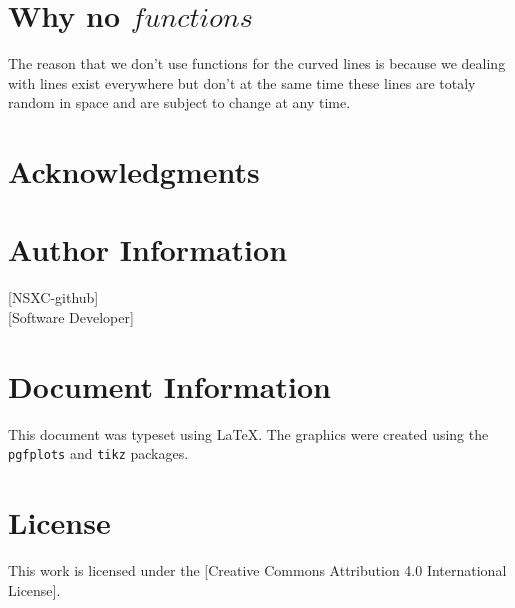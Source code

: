 \documentclass{article}
\begin{document}
\section{Why no \(functions\)}

The reason that we don't use functions for the curved lines is because we dealing with lines exist everywhere but don't at the same time these lines are totaly random in space and are subject to change at any time. 


\section*{Acknowledgments}

\section*{Author Information}
{[NSXC-github]} \\
{[Software Developer]} \\

\section*{Document Information}
This document was typeset using \LaTeX. The graphics were created using the \texttt{pgfplots} and \texttt{tikz} packages.


\section*{License}
This work is licensed under the [Creative Commons Attribution 4.0 International License].
\end{document}
